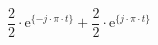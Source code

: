 \correct
\[
\frac{2}{2}\cdot\textrm{e}^{\{-j \cdot \pi \cdot t \}}
+\frac{2}{2}\cdot\textrm{e}^{\{ j \cdot \pi \cdot t \}}
\]
